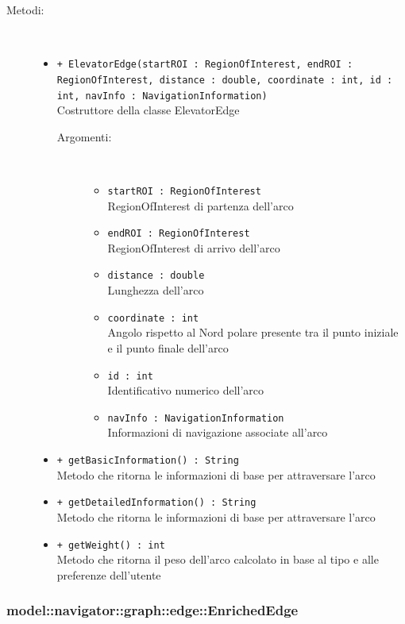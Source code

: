 \documentclass[../DefinizioneDiProdotto.tex]{subfiles}
\begin{document}
\begin{description}
\begin{itemize}
\end{itemize}
\item[Metodi:] \
\begin{itemize}
\item \texttt{+ ElevatorEdge(startROI : RegionOfInterest, endROI : RegionOfInterest, distance : double, coordinate : int, id : int, navInfo : NavigationInformation)}\\
Costruttore della classe ElevatorEdge
 \begin{description}
\item[Argomenti:] \
\begin{itemize}
\item \texttt{startROI : RegionOfInterest}\\
RegionOfInterest di partenza dell'arco\item \texttt{endROI : RegionOfInterest}\\
RegionOfInterest di arrivo dell'arco\item \texttt{distance : double}\\
Lunghezza dell'arco\item \texttt{coordinate : int}\\
Angolo rispetto al Nord polare presente tra il punto iniziale e il punto finale dell'arco\item \texttt{id : int}\\
Identificativo numerico dell'arco\item \texttt{navInfo : NavigationInformation}\\
Informazioni di navigazione associate all'arco\end{itemize}
\end{description}
\item \texttt{+ getBasicInformation() : String}\\
Metodo che ritorna le informazioni di base per attraversare l'arco
 \item \texttt{+ getDetailedInformation() : String}\\
Metodo che ritorna le informazioni di base per attraversare l'arco
 \item \texttt{+ getWeight() : int}\\
Metodo che ritorna il peso dell'arco calcolato in base al tipo e alle preferenze dell'utente
 \end{itemize}
\end{description}

\subsubsection{model::navigator::graph::edge::EnrichedEdge}
\end{document}
